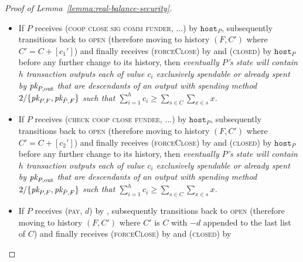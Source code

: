 \begin{proof}[Proof of Lemma~\ref{lemma:real-balance-security}]
\begin{itemize}
{    spent by $\pk{P, \mathrm{out}}$ that are descendants of an output with
    spending method $2/\{\pk{P, F}, \pk{\bar{P}, F}\}$ such that
    $\sum\limits_{i=1}^h c_i \geq \sum\limits_{s \in C} \sum\limits_{x \in s}
    x$.} Furthermore, \emph{there exists a local, kindred machine $R$ that
    transitioned to the \textsc{open} state after the last time control was
    obtained by one of $P$'s kindred machines and before $P$ transitioned to the
    \textsc{open} state, such that $R$ obtained $c_2' = c_{\mathrm{virt}} -
    c_1'$ coins during its last activation.} (In other words, $P$ and $R$ broke
    even on aggregate by first supporting the opening and then the cooperative
    closing of a virtual channel.)
    \item If $P$ receives (\textsc{coop close sig comm funder}, $\dots$) by
    $\texttt{host}_P$, subsequently transitions back to \textsc{open} (therefore
    moving to history $(F, C')$ where $C' = C + [c_1']$) and finally receives
    (\textsc{forceClose}) by \environment and (\textsc{closed}) by
    $\texttt{host}_P$ before any further change to its history, then
    \emph{eventually $P$'s \ledger state will contain $h$ transaction outputs
    each of value $c_i$ exclusively spendable or already spent by $\pk{P,
    \mathrm{out}}$ that are descendants of an output with spending method
    $2/\{\pk{P, F}, \pk{\bar{P}, F}\}$ such that $\sum\limits_{i=1}^h c_i \geq
    \sum\limits_{s \in C} \sum\limits_{x \in s} x$.}
    \item If $P$ receives (\textsc{check coop close fundee}, $\dots$) by
    $\texttt{host}_P$, subsequently transitions back to \textsc{open} (therefore
    moving to history $(F, C')$ where $C' = C + [c_2']$) and finally receives
    (\textsc{forceClose}) by \environment and (\textsc{closed}) by
    $\texttt{host}_P$ before any further change to its history, then
    \emph{eventually $P$'s \ledger state will contain $h$ transaction outputs
    each of value $c_i$ exclusively spendable or already spent by $\pk{P,
    \mathrm{out}}$ that are descendants of an output with spending method
    $2/\{\pk{P, F}, \pk{\bar{P}, F}\}$ such that $\sum\limits_{i=1}^h c_i \geq
    \sum\limits_{s \in C} \sum\limits_{x \in s} x$.}
    \item If $P$ receives (\textsc{pay}, $d$) by \environment, subsequently
    transitions back to \textsc{open} (therefore moving to history $(F, C')$
    where $C'$ is $C$ with $-d$ appended to the last list of $C$) and finally
    receives (\textsc{forceClose}) by \environment and (\textsc{closed}) by

\end{itemize}
\end{proof}
